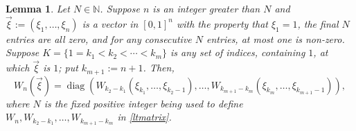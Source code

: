 \documentclass[12pt]{amsart}
\numberwithin{equation}{section}
\newtheorem{lemma}[theorem]{Lemma}
\theoremstyle{definition}
\theoremstyle{remark}
\newcommand{\diag}{\operatorname{diag}}
\newcommand{\NN}{\mathbb{N}}
\begin{document}
\begin{lemma}
	\label{Wn reduction}
	Let $N\in\NN$. Suppose $n$ is an integer greater than $N$ and $\vec{\xi}:=(\xi_{1},\ldots,\xi_{n})$ is a vector in $[0,1]^{n}$ with the property that $\xi_{1}=1$, the final $N$ entries are all zero, and for any consecutive $N$ entries, at most one is non-zero. Suppose $K=\{1=k_{1}<k_{2}<\cdots<k_{m}\}$ is any set of indices, containing $1$, at which $\vec{\xi}$ is $1$; put $k_{m+1}:=n+1$. Then, 
	\begin{equation}
	\label{Wn decomp}
	W_{n}(\vec{\xi})=\diag\left(W_{k_{2}-k_{1}}(\xi_{k_{1}},\ldots,\xi_{k_{2}-1}),\ldots,W_{k_{m+1}-k_{m}}(\xi_{k_{m}},\ldots,\xi_{k_{m+1}-1})\right),
	\end{equation}
	where $N$ is the fixed positive integer being used to define $W_{n},W_{k_{2}-k_{1}},\ldots,W_{k_{m+1}-k_{m}}$ in \autoref{ltmatrix}.
\end{lemma}
\end{document}
